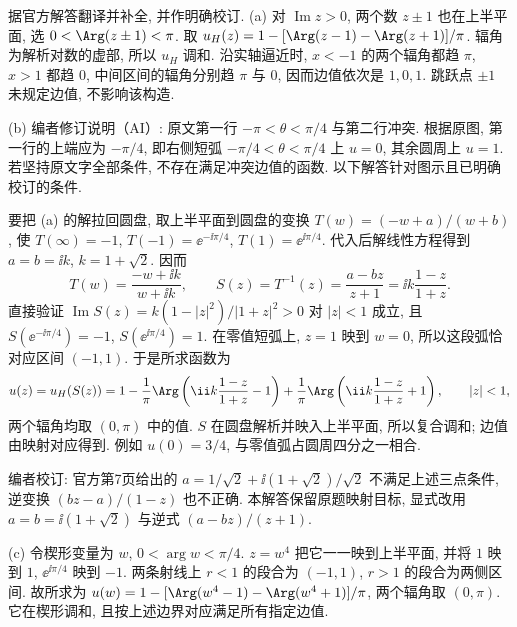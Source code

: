 \begin{solution}
据官方解答翻译并补全, 并作明确校订.
(a) 对 $\operatorname{Im}z>0$, 两个数 $z\pm1$ 也在上半平面, 选 $0<\Arg(z\pm1)<\pi$. 取
$u_H(z)=1-[\Arg(z-1)-\Arg(z+1)]/\pi$.
辐角为解析对数的虚部, 所以 $u_H$ 调和. 沿实轴逼近时, $x<-1$ 的两个辐角都趋 $\pi$, $x>1$ 都趋 $0$, 中间区间的辐角分别趋 $\pi$ 与 $0$, 因而边值依次是 $1,0,1$. 跳跃点 $\pm1$ 未规定边值, 不影响该构造.

(b) 编者修订说明（AI）: 原文第一行 $-\pi<\theta<\pi/4$ 与第二行冲突. 根据原图, 第一行的上端应为 $-\pi/4$, 即右侧短弧 $-\pi/4<\theta<\pi/4$ 上 $u=0$, 其余圆周上 $u=1$. 若坚持原文字全部条件, 不存在满足冲突边值的函数. 以下解答针对图示且已明确校订的条件.

要把 (a) 的解拉回圆盘, 取上半平面到圆盘的变换 $T(w)=(-w+a)/(w+b)$, 使 $T(\infty)=-1$, $T(-1)=\ee^{-\ii\pi/4}$, $T(1)=\ee^{\ii\pi/4}$. 代入后解线性方程得到 $a=b=\ii k$, $k=1+\sqrt2$. 因而
\[
 T(w)=\frac{-w+\ii k}{w+\ii k},\qquad
 S(z)=T^{-1}(z)=\frac{a-bz}{z+1}=\ii k\frac{1-z}{1+z}.
\]
直接验证 $\operatorname{Im}S(z)=k(1-|z|^2)/|1+z|^2>0$ 对 $|z|<1$ 成立, 且 $S(\ee^{-\ii\pi/4})=-1$, $S(\ee^{\ii\pi/4})=1$. 在零值短弧上, $z=1$ 映到 $w=0$, 所以这段弧恰对应区间 $(-1,1)$.
于是所求函数为
\[
 u(z)=u_H(S(z))
 =1-\frac1\pi\Arg\left(\ii k\frac{1-z}{1+z}-1\right)
 +\frac1\pi\Arg\left(\ii k\frac{1-z}{1+z}+1\right),\qquad |z|<1,
\]
两个辐角均取 $(0,\pi)$ 中的值. $S$ 在圆盘解析并映入上半平面, 所以复合调和; 边值由映射对应得到. 例如 $u(0)=3/4$, 与零值弧占圆周四分之一相合.

编者校订: 官方第7页给出的 $a=1/\sqrt2+\ii(1+\sqrt2)/\sqrt2$ 不满足上述三点条件, 逆变换 $(bz-a)/(1-z)$ 也不正确. 本解答保留原题映射目标, 显式改用 $a=b=\ii(1+\sqrt2)$ 与逆式 $(a-bz)/(z+1)$.

(c) 令楔形变量为 $w$, $0<\arg w<\pi/4$. $z=w^4$ 把它一一映到上半平面, 并将 $1$ 映到 $1$, $\ee^{\ii\pi/4}$ 映到 $-1$. 两条射线上 $r<1$ 的段合为 $(-1,1)$, $r>1$ 的段合为两侧区间. 故所求为
$u(w)=1-[\Arg(w^4-1)-\Arg(w^4+1)]/\pi$, 两个辐角取 $(0,\pi)$. 它在楔形调和, 且按上述边界对应满足所有指定边值.
\end{solution}

